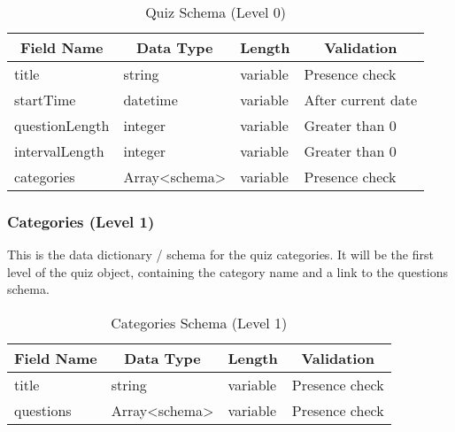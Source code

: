 \begin{table}[]
\centering
\begin{tabular}{|l|l|l|l|}
\hline
\multicolumn{1}{|c|}{{\bf Field Name}} & \multicolumn{1}{c|}{{\bf Data Type}} & \multicolumn{1}{c|}{{\bf Length}} & \multicolumn{1}{c|}{{\bf Validation}} \\ \hline
title                                  & string                               & variable                          & Presence check                        \\ \hline
startTime                              & datetime                             & variable                          & After current date                    \\ \hline
questionLength                         & integer                              & variable                          & Greater than 0                        \\ \hline
intervalLength                         & integer                              & variable                          & Greater than 0                        \\ \hline
categories                             & Array<schema>                               & variable                          & Presence check                        \\ \hline
\end{tabular}
\caption{Quiz Schema (Level 0)}
\end{table}

\subsubsection{Categories (Level 1)}
This is the data dictionary / schema for the quiz categories. It will be the first level of the quiz object, containing the category name and a link to the questions schema.

\begin{table}[]
\centering
\begin{tabular}{|l|l|l|l|}
\hline
\multicolumn{1}{|c|}{{\bf Field Name}} & \multicolumn{1}{c|}{{\bf Data Type}} & \multicolumn{1}{c|}{{\bf Length}} & \multicolumn{1}{c|}{{\bf Validation}} \\ \hline
title & string & variable & Presence check \\ \hline
questions & Array<schema> & variable & Presence check \\ \hline
\end{tabular}
\caption{Categories Schema (Level 1)}
\end{table}


